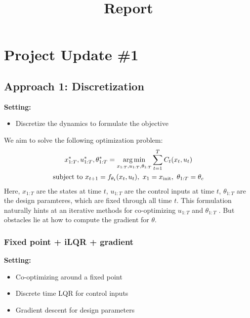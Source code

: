\documentclass{article}
\begin{document}
\title{Report}
\date{}
\maketitle


\section{Project Update \#1}

\subsection{Approach 1: Discretization}


\textbf{Setting:}
\vspace{-5pt}
\begin{itemize}
    \setlength{\itemsep}{0pt}
    \setlength{\parsep}{0pt}
    \setlength{\parskip}{0pt}
    \item Discretize the dynamics to formulate the objective
\end{itemize}


We aim to solve the following optimization problem:
\begin{gather*}
x_{1:T}^*, u_{1:T}^*, \theta_{1:T}^* = \operatorname*{arg\,min}\limits_{x_{1:T},u_{1:T},\theta_{1:T}}  \sum\limits_{t=1}^{T}  C_t(x_t,u_t) \\
\text{subject to~} x_{t+1} = f_{\theta_t}(x_t,u_t),~x_1 = x_{\text{init}},~\theta_{1:T} = \theta_c
\end{gather*}
Here, $x_{1:T}$ are the states at time $t$, $u_{1:T}$ are the control inputs at time $t$, $\theta_{1:T}$ are the design paramteres, which are fixed through all time $t$. This formulation naturally hints at an iterative methods for co-optimizing $u_{1:T}$ and $\theta_{1:T}$ . But obstacles lie at how to compute the gradient for $\theta$. 

\subsubsection{Fixed point + iLQR + gradient}



\textbf{Setting:}
\vspace{-5pt}
\begin{itemize}
    \setlength{\itemsep}{0pt}
    \setlength{\parsep}{0pt}
    \setlength{\parskip}{0pt}
    \item Co-optimizing around a fixed point
    \item Discrete time LQR for control inputs
    \item Gradient descent for design parameters
\end{itemize}
\end{document}
